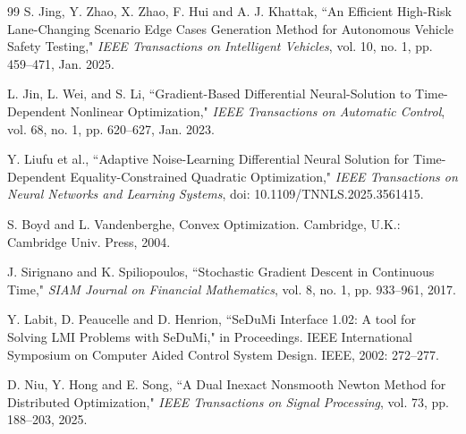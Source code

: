 \documentclass[pdflatex,sn-mathphys,Numbered]{sn-jnl}
\theoremstyle{thmstyleone}
\theoremstyle{thmstyletwo}
\theoremstyle{thmstylethree}
\begin{document}
\begin{thebibliography}{99}
 S. Jing, Y. Zhao, X. Zhao, F. Hui and A. J. Khattak, ``An Efficient High-Risk Lane-Changing Scenario Edge Cases Generation Method for Autonomous Vehicle Safety Testing," \emph{IEEE Transactions on Intelligent Vehicles}, vol. 10, no. 1, pp. 459--471, Jan. 2025.

 L. Jin, L. Wei, and S. Li, ``Gradient-Based Differential Neural-Solution to Time-Dependent Nonlinear Optimization," \emph{IEEE Transactions on Automatic Control}, vol. 68, no. 1, pp. 620--627, Jan. 2023.

 Y. Liufu et al., ``Adaptive Noise-Learning Differential Neural Solution for Time-Dependent Equality-Constrained Quadratic Optimization," \emph{IEEE Transactions on Neural Networks and Learning Systems}, doi: 10.1109/TNNLS.2025.3561415.

 S. Boyd and L. Vandenberghe, Convex Optimization. Cambridge, U.K.: Cambridge Univ. Press, 2004.

 J. Sirignano and K. Spiliopoulos, ``Stochastic Gradient Descent in Continuous Time," \emph{SIAM Journal on Financial Mathematics}, vol. 8, no. 1, pp. 933--961, 2017.

 Y. Labit, D. Peaucelle and D. Henrion, ``SeDuMi Interface 1.02: A tool for Solving LMI Problems with SeDuMi," in Proceedings. IEEE International Symposium on Computer Aided Control System Design. IEEE, 2002: 272--277.

 D. Niu, Y. Hong and E. Song, ``A Dual Inexact Nonsmooth Newton Method for Distributed Optimization," \emph{IEEE Transactions on Signal Processing}, vol. 73, pp. 188--203, 2025.

\end{thebibliography}
\end{document}
